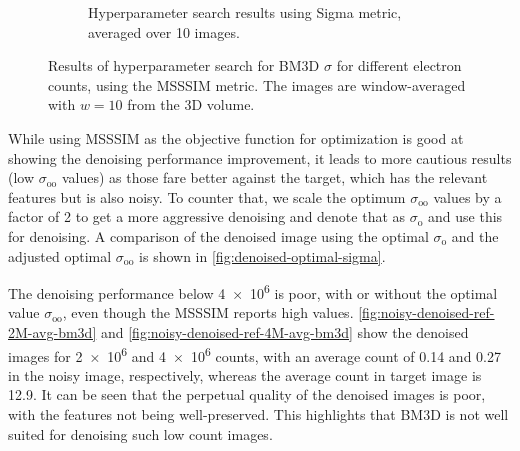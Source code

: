 \begin{figure}
\begin{subfigure}[t]{0.49\linewidth}
        \caption{Hyperparameter search results using Sigma metric, averaged over 10 images.}
        \label{fig:hyperparameter-sigma-averaged-10-images}
    \end{subfigure}
    \caption{Results of hyperparameter search for \gls{BM3D} $\sigma$ for different electron counts, using the \gls{MSSSIM} metric. The images are window-averaged with $w=10$ from the 3D volume.}
    \label{fig:hyperparameter-averaged-10-images}
\end{figure}

While using \gls{MSSSIM} as the objective function for optimization is good at showing the denoising performance improvement, it leads to more cautious results (low $\sigma_{\text{oo}}$ values) as those fare better against the target, which has the relevant features but is also noisy. To counter that, we scale the optimum $\sigma_{\text{oo}}$ values by a factor of 2 to get a more aggressive denoising and denote that as $\sigma_{\text{o}}$ and use this for denoising. A comparison of the denoised image using the optimal $\sigma_{\text{o}}$ and the adjusted optimal $\sigma_{\text{oo}}$ is shown in \cref{fig:denoised-optimal-sigma}.

The denoising performance below \num{4e6} is poor, with or without the optimal value $\sigma_{\text{oo}}$, even though the \gls{MSSSIM} reports high values. \cref{fig:noisy-denoised-ref-2M-avg-bm3d} and \cref{fig:noisy-denoised-ref-4M-avg-bm3d} show the denoised images for \num{2e6} and \num{4e6} counts, with an average count of \num{0.14} and \num{0.27} in the noisy image, respectively, whereas the average count in target image is \num{12.9}. It can be seen that the perpetual quality of the denoised images is poor, with the features not being well-preserved. This highlights that \gls{BM3D} is not well suited for denoising such low count images.

